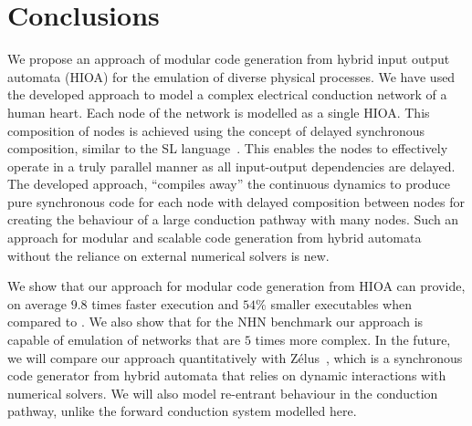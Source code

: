 \section{Conclusions}

We propose an approach of modular code generation 
from hybrid input output automata (HIOA)
for the emulation of diverse physical processes. 
We have used the developed approach to model 
 a complex electrical conduction network of a human heart.
Each node of the network is modelled as a single HIOA.
This composition of nodes is achieved using the concept of 
delayed synchronous composition, similar to the SL 
language~\cite{SlLanguage}. 
This enables the nodes to effectively operate 
in a truly parallel manner as all
input-output dependencies are delayed. 
The developed approach,  ``compiles away'' the continuous dynamics to
produce pure synchronous code for each node with delayed composition between nodes for creating the behaviour of a large conduction 
pathway with many nodes. Such an approach for modular and scalable code generation from hybrid automata without the reliance on external numerical solvers is new.

 We show that our approach for modular code generation from \ac{HIOA} can 
provide, on average $9.8$ times faster execution and $54\%$ smaller executables 
when compared to \simulink.
We also show that for the \acf{NHN} benchmark our approach is capable of 
emulation of networks that are $5$ times more complex. 
In the future, we will compare our approach quantitatively with Z\'{e}lus~\cite{bourke13zelus},
 which is a synchronous code generator from hybrid automata that relies on dynamic interactions with numerical solvers.
We will also model re-entrant behaviour in the conduction pathway, unlike the forward conduction system modelled here.

